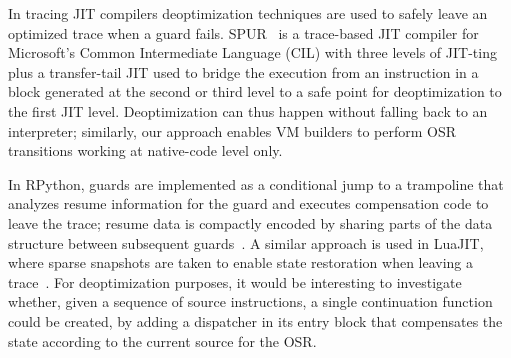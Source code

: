 In tracing JIT compilers deoptimization techniques are used to safely leave an optimized trace when a guard fails. SPUR~\cite{Bebenita10} is a trace-based JIT compiler for Microsoft's Common Intermediate Language (CIL) with three levels of JIT-ting plus a transfer-tail JIT used to bridge the execution from an instruction in a block generated at the second or third level to a safe point for deoptimization to the first JIT level. Deoptimization can thus happen without falling back to an interpreter; similarly, our approach enables VM builders to perform OSR transitions working at native-code level only.

In RPython, guards are implemented as a conditional jump to a trampoline that analyzes resume information for the guard and executes compensation code to leave the trace; resume data is compactly encoded by sharing parts of the data structure between subsequent guards~\cite{Schneider12}. A similar approach is used in LuaJIT, where sparse snapshots are taken to enable state restoration when leaving a trace~\cite{luajit}. For deoptimization purposes, it would be interesting to investigate whether, given a sequence of source instructions, a single continuation function could be created, by adding a dispatcher in its entry block that compensates the state according to the current source for the OSR.